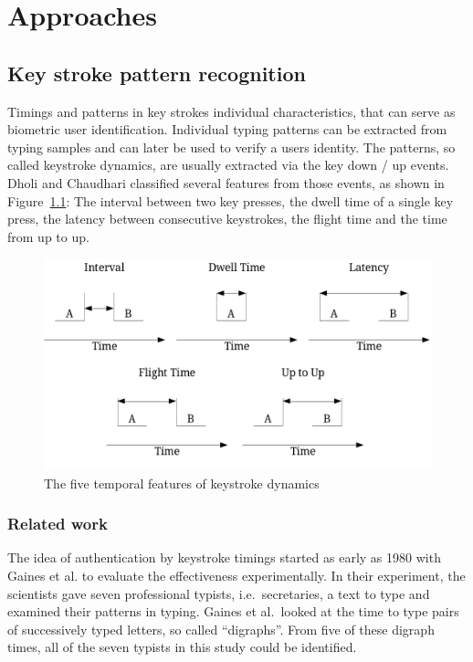 \chapter{Approaches}\label{chapter:approaches}

\section{Key stroke pattern recognition}
Timings and patterns in key strokes individual characteristics, that can serve as biometric user identification. Individual typing patterns can be extracted from typing samples and can later be used to verify a users identity. The patterns, so called keystroke dynamics, are usually extracted via the key down / up events. Dholi and Chaudhari\cite{dholi2013typing} classified several features from those events, as shown in Figure~\ref{fig:keystrokeFeatures}: The interval between two key presses, the dwell time of a single key press, the latency between consecutive keystrokes, the flight time and the time from up to up.

\begin{figure}
    \centering
    \includegraphics[width=\linewidth]{figures/KeystrokeTemporalFeatures.png}
    \caption{The five temporal features of keystroke dynamics\cite{dholi2013typing}}
    \label{fig:keystrokeFeatures}
\end{figure}
\subsection{Related work}
The idea of authentication by keystroke timings started as early as 1980 with Gaines et al.\cite{gaines1980authentication} to evaluate the effectiveness experimentally. In their experiment, the scientists gave seven professional typists, i.e.\ secretaries, a text to type and examined their patterns in typing. Gaines et al.\ looked at the time to type pairs of successively typed letters, so called ``digraphs''. From five of these digraph times, all of the seven typists in this study could be identified.

